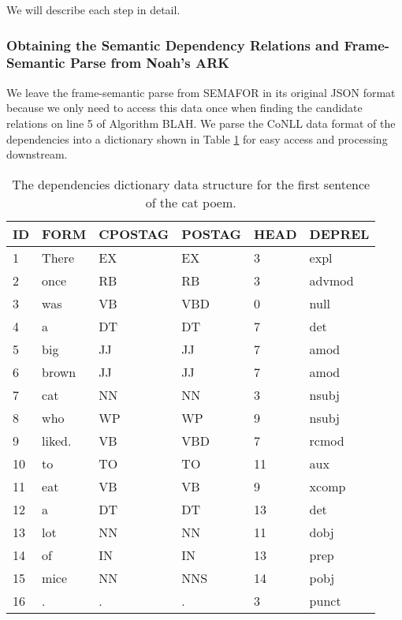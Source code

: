 We will describe each step in detail.

\subsubsection{Obtaining the Semantic Dependency Relations and Frame-Semantic Parse from Noah's ARK}

We leave the frame-semantic parse from SEMAFOR in its original JSON format because we only need to access this data once when finding the candidate relations on line 5 of Algorithm BLAH. We parse the CoNLL data format of the dependencies into a dictionary shown in Table \ref{tab:DepDict} for easy access and processing downstream.

\begin{table}
\centering
    \begin{tabular}{|l|l|l|l|l|l|}
    \hline
    ID & FORM   & CPOSTAG & POSTAG & HEAD & DEPREL \\ \hline
    1  & There  & EX      & EX     & 3    & expl   \\
    2  & once   & RB      & RB     & 3    & advmod \\
    3  & was    & VB      & VBD    & 0    & null   \\
    4  & a      & DT      & DT     & 7    & det    \\
    5  & big    & JJ      & JJ     & 7    & amod   \\
    6  & brown  & JJ      & JJ     & 7    & amod   \\
    7  & cat    & NN      & NN     & 3    & nsubj  \\
    8  & who    & WP      & WP     & 9    & nsubj  \\
    9  & liked. & VB      & VBD    & 7    & rcmod  \\
    10 & to     & TO      & TO     & 11   & aux    \\
    11 & eat    & VB      & VB     & 9    & xcomp  \\
    12 & a      & DT      & DT     & 13   & det    \\
    13 & lot    & NN      & NN     & 11   & dobj   \\
    14 & of     & IN      & IN     & 13   & prep   \\
    15 & mice   & NN      & NNS    & 14   & pobj   \\
    16 & .      & .       & .      & 3    & punct  \\ \hline
    \end{tabular}
\caption{The dependencies dictionary data structure for the first sentence of the cat poem.}
\label{tab:DepDict}
\end{table}


